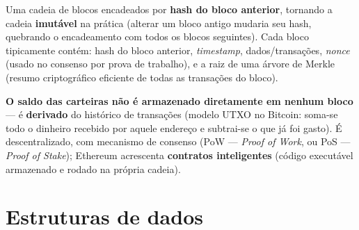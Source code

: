 \begin{conceito}
Uma cadeia de blocos encadeados por \textbf{hash do bloco anterior},
tornando a cadeia \textbf{imutável} na prática (alterar um bloco antigo
mudaria seu hash, quebrando o encadeamento com todos os blocos
seguintes). Cada bloco tipicamente contém: hash do bloco anterior,
\textit{timestamp}, dados/transações, \textit{nonce} (usado no consenso
por prova de trabalho), e a raiz de uma árvore de Merkle (resumo
criptográfico eficiente de todas as transações do bloco).

\textbf{O saldo das carteiras não é armazenado diretamente em nenhum
bloco} --- é \textbf{derivado} do histórico de transações (modelo UTXO
no Bitcoin: soma-se todo o dinheiro recebido por aquele endereço e
subtrai-se o que já foi gasto). É descentralizado, com mecanismo de
consenso (PoW --- \textit{Proof of Work}, ou PoS --- \textit{Proof of
Stake}); Ethereum acrescenta \textbf{contratos inteligentes} (código
executável armazenado e rodado na própria cadeia).
\end{conceito}

\section{Estruturas de dados}
\label{sec:estruturas-dados-teoria}

